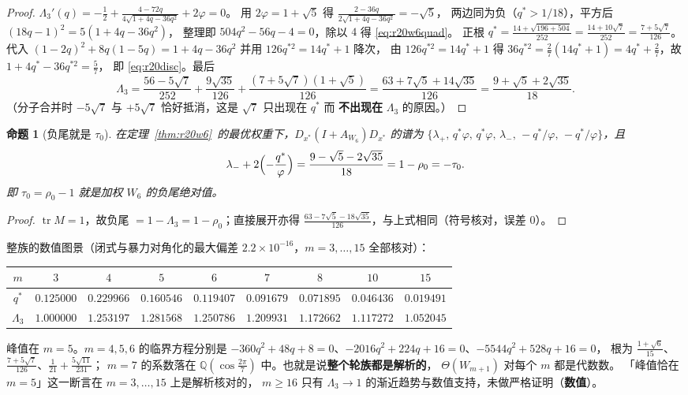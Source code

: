 \documentclass[UTF8,11pt]{ctexart}
\newtheorem{proposition}[theorem]{命题}
\theoremstyle{definition}
\newcommand{\Lam}{\Lambda}
\newcommand{\tr}{\operatorname{tr}}
\newcommand{\Q}{\mathbb{Q}}
\begin{document}
\begin{proof}
$\Lam_3'(q)=-\frac12+\frac{4-72q}{4\sqrt{1+4q-36q^2}}+2\varphi=0$。
用 $2\varphi=1+\sqrt5$ 得 $\frac{2-36q}{2\sqrt{1+4q-36q^2}}=-\sqrt5$，
两边同为负（$q^*>1/18$），平方后 $(18q-1)^2=5(1+4q-36q^2)$，
整理即 $504q^2-56q-4=0$，除以 $4$ 得 \eqref{eq:r20w6quad}。
正根 $q^*=\frac{14+\sqrt{196+504}}{252}=\frac{14+10\sqrt7}{252}=\frac{7+5\sqrt7}{126}$。
代入 $(1-2q)^2+8q(1-5q)=1+4q-36q^2$ 并用 $126q^{*2}=14q^*+1$ 降次，
由 $126q^{*2}=14q^*+1$ 得 $36q^{*2}=\frac27(14q^*+1)=4q^*+\frac27$，故 $1+4q^*-36q^{*2}=\frac57$，
即 \eqref{eq:r20disc}。最后
\[
\Lam_3=\frac{56-5\sqrt7}{252}+\frac{9\sqrt{35}}{126}+\frac{(7+5\sqrt7)(1+\sqrt5)}{126}
=\frac{63+7\sqrt5+14\sqrt{35}}{126}=\frac{9+\sqrt5+2\sqrt{35}}{18}.
\]
（分子合并时 $-5\sqrt7$ 与 $+5\sqrt7$ 恰好抵消，这是 $\sqrt7$ 只出现在 $q^*$ 而
\textbf{不出现在} $\Lam_3$ 的原因。）
\end{proof}

\begin{proposition}[负尾就是 $\tau_0$]\label{prop:r20tail}
在定理~\ref{thm:r20w6}~的最优权重下，$D_{x^*}(I+A_{W_6})D_{x^*}$ 的谱为
$\{\lambda_+,\,q^*\varphi,\,q^*\varphi,\,\lambda_-,\,-q^*/\varphi,\,-q^*/\varphi\}$，且
\begin{equation}\label{eq:r20tail}
\lambda_-+2\Bigl(-\frac{q^*}{\varphi}\Bigr)=\frac{9-\sqrt5-2\sqrt{35}}{18}=1-\rho_0=-\tau_0 .
\end{equation}
即 $\tau_0=\rho_0-1$ 就是加权 $W_6$ 的负尾绝对值。
\end{proposition}

\begin{proof}
$\tr M=1$，故负尾 $=1-\Lam_3=1-\rho_0$；直接展开亦得
$\frac{63-7\sqrt5-18\sqrt{35}}{126}$，与上式相同（符号核对，误差 $0$）。
\end{proof}

整族的数值图景（闭式与暴力对角化的最大偏差 $2.2\times10^{-16}$，$m=3,\dots,15$ 全部核对）：
\begin{center}\small
\begin{tabular}{c|cccccccc}
\toprule
$m$ & $3$ & $4$ & $5$ & $6$ & $7$ & $8$ & $10$ & $15$\\
\midrule
$q^*$ & $0.125000$ & $0.229966$ & $0.160546$ & $0.119407$ & $0.091679$ & $0.071895$ & $0.046436$ & $0.019491$\\
$\Lam_3$ & $1.000000$ & $1.253197$ & $\mathbf{1.281568}$ & $1.250786$ & $1.209931$ & $1.172662$ & $1.117272$ & $1.052045$\\
\bottomrule
\end{tabular}
\end{center}
峰值在 $m=5$。$m=4,5,6$ 的临界方程分别是
$-360q^2+48q+8=0$、$-2016q^2+224q+16=0$、$-5544q^2+528q+16=0$，
根为 $\frac{1+\sqrt6}{15}$、$\frac{7+5\sqrt7}{126}$、$\frac1{21}+\frac{5\sqrt{11}}{231}$；
$m=7$ 的系数落在 $\Q(\cos\frac{2\pi}7)$ 中。也就是说\textbf{整个轮族都是解析的}，
$\Theta(W_{m+1})$ 对每个 $m$ 都是代数数。
「峰值恰在 $m=5$」这一断言在 $m=3,\dots,15$ 上是解析核对的，
$m\ge16$ 只有 $\Lam_3\to1$ 的渐近趋势与数值支持，未做严格证明（\textbf{数值}）。
\end{document}
